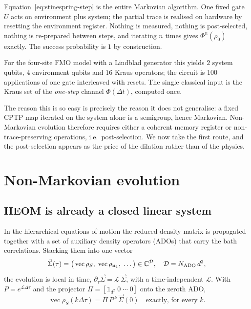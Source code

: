 \documentclass[aps,prx,twocolumn,superscriptaddress,nofootinbib,longbibliography]{revtex4-2}
\theoremstyle{plain}
\newcommand{\vecop}{\operatorname{vec}}
\begin{document}
Equation~\eqref{eq:stinespring-step} is the entire Markovian algorithm.  One
fixed gate $U$ acts on environment plus system; the partial trace is realised on
hardware by resetting the environment register.  Nothing is measured, nothing is
post-selected, nothing is re-prepared between steps, and iterating $n$ times
gives $\Phi^n(\rho_0)$ exactly.  The success probability is $1$ by construction.

For the four-site FMO model with a Lindblad generator this yields $2$ system
qubits, $4$ environment qubits and $16$ Kraus operators; the circuit is $100$
applications of one gate interleaved with resets.  The single classical input is
the Kraus set of the \emph{one-step} channel $\Phi(\Delta t)$, computed once.

The reason this is so easy is precisely the reason it does not generalise: a
fixed CPTP map iterated on the system alone is a semigroup, hence Markovian.
Non-Markovian evolution therefore requires either a coherent memory register or
non-trace-preserving operations, i.e.\ post-selection.  We now take the first
route, and the post-selection appears as the price of the dilation rather than
of the physics.

\section{Non-Markovian evolution}
\label{sec:nonmarkov}

\subsection{HEOM is already a closed linear system}

In the hierarchical equations of motion \cite{Tanimura1989,Tanimura2020} the
reduced density matrix is propagated together with a set of auxiliary density
operators (ADOs) that carry the bath correlations.  Stacking them into one
vector
\begin{equation}
\vec\Sigma(\tau)=\big(\vecop\rho_S,\;\vecop\rho_{\mathbf n_1},\;\dots\big)
\in\mathbb C^{\mathcal D},\quad \mathcal D=N_{\rm ADO}\,d^2,
\end{equation}
the evolution is local in time,
$\partial_\tau\vec\Sigma=\mathcal L\,\vec\Sigma$, with a time-independent
$\mathcal L$.  With $P=e^{\mathcal L\Delta\tau}$ and the projector
$\Pi=[\mathbb 1_{d^2}\;0\;\cdots\;0]$ onto the zeroth ADO,
\begin{equation}
\boxed{\;\vecop\rho_S(k\Delta\tau)=\Pi\,P^{\,k}\,\vec\Sigma(0)
\quad\text{exactly, for every }k.\;}
\label{eq:exact}
\end{equation}
\end{document}
